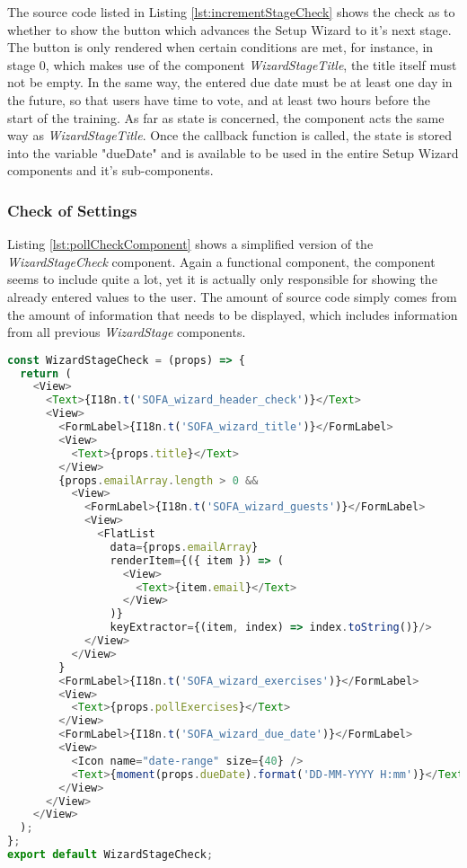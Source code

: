 The source code listed in Listing \ref{lst:incrementStageCheck} shows the check as to whether to show the button which advances the Setup Wizard to it's next stage. The button is only rendered when certain conditions are met, for instance, in stage 0, which makes use of the component \textit{WizardStageTitle}, the title itself must not be empty. In the same way, the entered due date must be at least one day in the future, so that users have time to vote, and at least two hours before the start of the training.
\newline
As far as state is concerned, the component acts the same way as \textit{WizardStageTitle}. Once the callback function is called, the state is stored into the variable "dueDate" and is available to be used in the entire Setup Wizard components and it's sub-components.

\subsubsection{Check of Settings}
\label{sssec:poll_check}

Listing \ref{lst:pollCheckComponent} shows a simplified version of the \textit{WizardStageCheck} component. Again a functional component, the component seems to include quite a lot, yet it is actually only responsible for showing the already entered values to the user. The amount of source code simply comes from the amount of information that needs to be displayed, which includes information from all previous \textit{WizardStage} components.

\begin{lstlisting}[language=javascript,caption=Simplified Poll Check Component,label=lst:pollCheckComponent]
const WizardStageCheck = (props) => {
  return (
    <View>
      <Text>{I18n.t('SOFA_wizard_header_check')}</Text>
      <View>
        <FormLabel>{I18n.t('SOFA_wizard_title')}</FormLabel>
        <View>
          <Text>{props.title}</Text>
        </View>
        {props.emailArray.length > 0 &&
          <View>
            <FormLabel>{I18n.t('SOFA_wizard_guests')}</FormLabel>
            <View>
              <FlatList
                data={props.emailArray}
                renderItem={({ item }) => (
                  <View>
                    <Text>{item.email}</Text>
                  </View>
                )}
                keyExtractor={(item, index) => index.toString()}/>
            </View>
          </View>
        }
        <FormLabel>{I18n.t('SOFA_wizard_exercises')}</FormLabel>
        <View>
          <Text>{props.pollExercises}</Text>
        </View>
        <FormLabel>{I18n.t('SOFA_wizard_due_date')}</FormLabel>
        <View>
          <Icon name="date-range" size={40} />
          <Text>{moment(props.dueDate).format('DD-MM-YYYY H:mm')}</Text>
        </View>
      </View>
    </View>
  );
};
export default WizardStageCheck;
\end{lstlisting}

